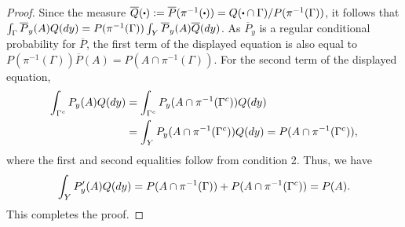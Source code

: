 \documentclass[10pt,a4paper]{amsart}
\renewcommand{\cdot}[1][.5]{%
  \mathbin{\vcenter{\hbox{\scalebox{#1}{$\bullet$}}}}%
}
\begin{document}
\begin{proof}
Since the measure $\overline{Q}(\cdot) := \overline{P}(\pi^{-1}(\cdot))= Q(\cdot \cap \Gamma)/P(\pi^{-1}(\Gamma))$, it follows that
$\int_{\Gamma}\overline{P}_{y}(A)Q({\rm d}y)= P(\pi^{-1}(\Gamma))\int_{Y}\overline{P}_{y}(A)\overline{Q}({\rm d}y)$.  As $\overline{P}_{y}$ is a regular conditional probability for $\overline{P}$, the first term of the displayed equation is also equal to $P(\pi^{-1}(\Gamma))\overline{P}(A)=P(A\cap\pi^{-1}(\Gamma))$. For the second term of the displayed equation,
\begin{align*}
\int_{\Gamma^{c}}P_{y}(A)Q({\rm d}y)&=\int_{\Gamma^{c}}P_{y}(A\cap\pi^{-1}(\Gamma^{c}))Q({\rm d}y)\\
&=\int_{Y}P_{y}(A\cap\pi^{-1}(\Gamma^{c}))Q({\rm d}y)=P(A\cap\pi^{-1}(\Gamma^{c})),
\end{align*}
where the first and second equalities follow from condition 2.
Thus, we have
\[
\int_{Y}P_{y}^\prime(A)Q({\rm d}y)=P(A\cap\pi^{-1}(\Gamma))+P(A\cap\pi^{-1}(\Gamma^{c}))=P(A).
\]
This completes the proof.
\end{proof}
\end{document}
